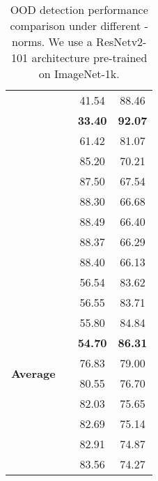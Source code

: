 \documentclass{article}
\begin{document}
\begin{table}[t]
\begin{tabular}{c|c|cc}
                                       &                            & 41.54                & 88.46                \\
                                       &                           & \textbf{33.40}       & \textbf{92.07}       \\
                                       &                              & 61.42                & 81.07                \\
                                       &                              & 85.20                & 70.21                \\
                                       &                              & 87.50                & 67.54                \\
                                       &                              & 88.30                & 66.68                \\
                                       &                              & 88.49                & 66.40                \\
                                       &                              & 88.37                & 66.29                \\
                                       &                            & 88.40                & 66.13                \\ \midrule
\multirow{10}{*}{\textbf{Average}}     &                            & 56.54                & 83.62                \\
                                       &                            & 56.55                & 83.71                \\
                                       &                           & 55.80                & 84.84                \\
                                       &                              & \textbf{54.70}       & \textbf{86.31}       \\
                                       &                              & 76.83                & 79.00                \\
                                       &                              & 80.55                & 76.70                \\
                                       &                              & 82.03                & 75.65                \\
                                       &                              & 82.69                & 75.14                \\
                                       &                              & 82.91                & 74.87                \\
                                       &                            & 83.56                & 74.27                \\ \bottomrule
\end{tabular}
    \caption{OOD detection performance comparison under different -norms. We use a ResNetv2-101 architecture pre-trained on ImageNet-1k.}
    \label{tab:more_norm}
\end{table}
\end{document}
